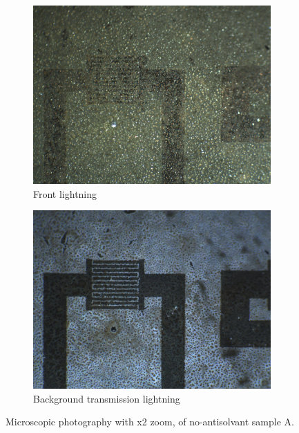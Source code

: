 \begin{figure}
    \centering
\begin{subfigure}{.4\textwidth}
    \centering
    \includegraphics[width=\textwidth]{Data/SampleA_2xzoom.jpg}
    \caption{Front lightning}
\end{subfigure}
\begin{subfigure}{.4\textwidth}
    \centering
    \includegraphics[width=\textwidth]{Data/SampleA_x2zoom_transmission.jpg}
    \caption{Background transmission lightning}
\end{subfigure}
\caption{Microscopic photography with x2 zoom, of no-antisolvant sample A.}\label{fig:optic-A}
\end{figure}


